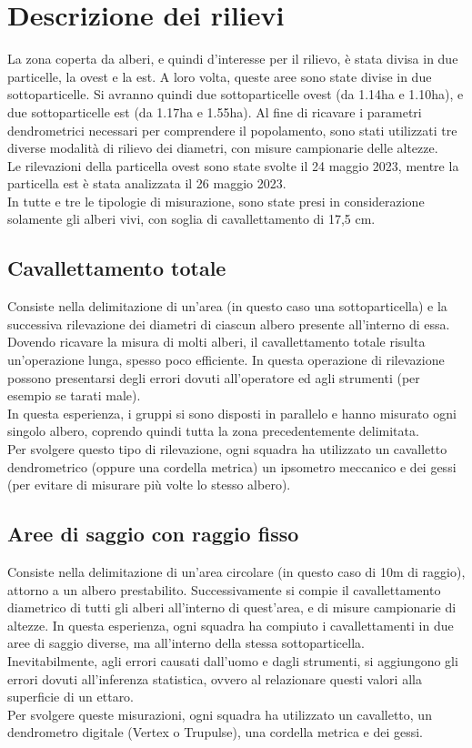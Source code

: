 \section{Descrizione dei rilievi}
La zona coperta da alberi, e quindi d'interesse per il rilievo, è stata divisa in due particelle, la ovest e la est. A loro volta, queste aree sono state divise in due sottoparticelle. Si avranno quindi due sottoparticelle ovest (da  1.14ha e 1.10ha), e due sottoparticelle est (da 1.17ha e 1.55ha).
Al fine di ricavare i parametri dendrometrici necessari per comprendere il popolamento, sono stati utilizzati tre diverse modalità di rilievo dei diametri, con misure campionarie delle altezze.\\
Le rilevazioni della particella ovest sono state svolte il 24 maggio 2023, mentre la particella est è stata analizzata il 26 maggio 2023.\\
In tutte e tre le tipologie di misurazione, sono state presi in considerazione solamente gli alberi vivi, con soglia di cavallettamento di 17,5 cm.\\

\subsection{Cavallettamento totale}
Consiste nella delimitazione di un'area (in questo caso una sottoparticella) e la successiva rilevazione dei diametri di ciascun albero presente all'interno di essa. Dovendo ricavare la misura di molti alberi, il cavallettamento totale risulta un'operazione lunga, spesso poco efficiente. In questa operazione di rilevazione possono presentarsi degli errori dovuti all'operatore ed agli strumenti (per esempio se tarati male).\\
In questa esperienza, i gruppi si sono disposti in parallelo e hanno misurato ogni singolo albero, coprendo quindi tutta la zona precedentemente delimitata.\\
Per svolgere questo tipo di rilevazione, ogni squadra ha utilizzato un cavalletto dendrometrico (oppure una cordella metrica) un ipsometro meccanico e dei gessi (per evitare di misurare più volte lo stesso albero).
\subsection{Aree di saggio con raggio fisso}
Consiste nella delimitazione di un'area circolare (in questo caso di 10m di raggio), attorno a un albero prestabilito. Successivamente si compie il cavallettamento diametrico di tutti gli alberi all'interno di quest'area, e di misure campionarie di altezze. In questa esperienza, ogni squadra ha compiuto i cavallettamenti in due aree di saggio diverse, ma all'interno della stessa sottoparticella.\\
Inevitabilmente, agli errori causati dall'uomo e dagli strumenti, si aggiungono gli errori dovuti all'inferenza statistica, ovvero al relazionare questi valori alla superficie di un ettaro. \\
Per svolgere queste misurazioni, ogni squadra ha utilizzato un cavalletto, un dendrometro digitale (Vertex o Trupulse), una cordella metrica e dei gessi.
